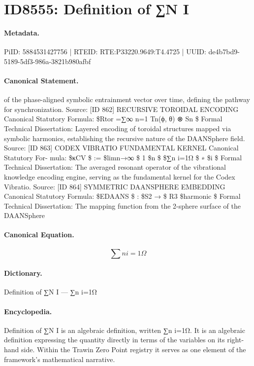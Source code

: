 \section*{ID8555: Definition of ∑N I}
\paragraph{Metadata.}
PiID: 5884531427756 | RTEID: RTE:P33220.9649:T4.4725 | UUID: de4b7bd9-5189-5df3-986a-3821b980afbf

\paragraph{Canonical Statement.}
of the phase-aligned symbolic entrainment vector over time, defining the pathway for synchronization. Source: [ID 862] RECURSIVE TOROIDAL ENCODING Canonical Statutory Formula: \$Rtor =∑∞ n=1 Tn(ϕ, θ) ⊗ Sn \$ Formal Technical Dissertation: Layered encoding of toroidal structures mapped via symbolic harmonics, establishing the recursive nature of the DAANSphere field. Source: [ID 863] CODEX VIBRATIO FUNDAMENTAL KERNEL Canonical Statutory For- mula: \$κCV \$ := \$limn→∞ \$ 1 \$n \$ \$∑n i=1Ω \$ ∗ \$i \$ Formal Technical Dissertation: The averaged resonant operator of the vibrational knowledge encoding engine, serving as the fundamental kernel for the Codex Vibratio. Source: [ID 864] SYMMETRIC DAANSPHERE EMBEDDING Canonical Statutory Formula: \$EDAANS \$ : \$S2 → \$ R3 \$harmonic \$ Formal Technical Dissertation: The mapping function from the 2-sphere surface of the DAANSphere

\paragraph{Canonical Equation.}
\[
∑n i=1Ω
\]

\paragraph{Dictionary.}
Definition of ∑N I — ∑n i=1Ω

\paragraph{Encyclopedia.}
Definition of ∑N I is an algebraic definition, written ∑n i=1Ω. It is an algebraic definition expressing the quantity directly in terms of the variables on its right-hand side. Within the Trawin Zero Point registry it serves as one element of the framework's mathematical narrative.
